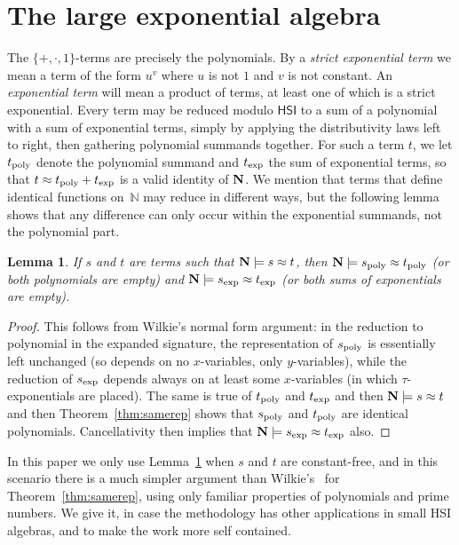 \documentclass[eqnor,reqno]{amsart}
\theoremstyle{plain}
\newtheorem{lem}[thm]{Lemma}
\theoremstyle{definition}
\newcommand{\HSI}{\textsf{HSI}}
\begin{document}
\section{The large exponential algebra}\label{sec:LEA}
The $\{+,\cdot,1\}$-terms are precisely the polynomials.  
By a \emph{strict exponential term} we mean a term of the form $u^v$ where $u$ is not $1$ and $v$ is not constant.
An \emph{exponential term} will mean a product of terms, at least one of which is a strict exponential.
Every term may be reduced modulo $\HSI$ to a sum of a polynomial with a sum of exponential terms, simply by applying the distributivity laws left to right, then gathering polynomial summands together.  
For such a term $t$, we let $t_{\rm poly}$ denote the polynomial summand and $t_{\rm exp}$ the sum of exponential terms, so that $t\approx t_{\rm poly}+t_{\rm exp}$ is a valid identity of ${\bf N}$.
We mention that terms that define identical functions on~$\mathbb{N}$ may reduce in different ways, but the following lemma shows that any difference can only occur within the exponential summands, not the polynomial part.
\begin{lem}\label{lem:polysum}
If $s$ and $t$ are terms such that ${\bf N}\models s\approx t$, then ${\bf N}\models s_{\rm poly}\approx t_{\rm poly}$ (or both polynomials are empty) and ${\bf N}\models s_{\rm exp}\approx t_{\rm exp}$ (or both sums of exponentials are empty).
\end{lem}
\begin{proof}
This follows from Wilkie's normal form argument: in the reduction to polynomial in the expanded signature, the representation of $s_{\rm poly}$ is essentially left unchanged (so depends on no $x$-variables, only $y$-variables), while the reduction of $s_{\rm exp}$ depends always on at least some $x$-variables (in which $\tau$-exponentials are placed).  
The same is true of $t_{\rm poly}$ and $t_{\rm exp}$ and then ${\bf N}\models s\approx t$ and then Theorem~\ref{thm:samerep} shows that $s_{\rm poly}$ and $t_{\rm poly}$ are identical polynomials.  Cancellativity then implies that ${\bf N}\models s_{\rm exp}\approx t_{\rm exp}$ also.
\end{proof}
In this paper we only use Lemma~\ref{lem:polysum} when $s$ and $t$ are constant-free, and in this scenario there is a much simpler argument than Wilkie's~\cite{wil00} for Theorem~\ref{thm:samerep}, using only familiar properties of polynomials and prime numbers.  We give it, in case the methodology has other applications in small HSI algebras, and to make the work more self contained.  
\end{document}
